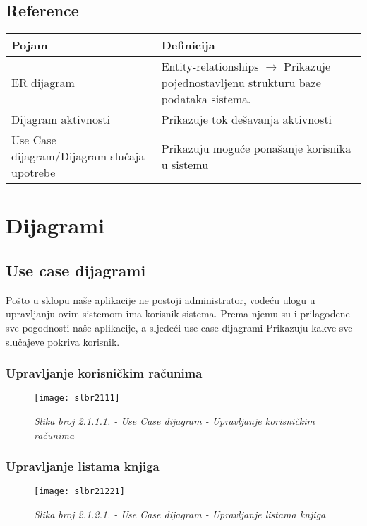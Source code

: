 \documentclass[a4paper oneside ,12pt]{article}
\begin{document}
\subsection{Reference}

\begin{center}
\begin{longtable}{| p{} | p{} |} 
 \hline
 \rowcolor{Apricot}
Pojam &	Definicija \\ \hline
ER dijagram	& Entity-relationships $\to$ Prikazuje pojednostavljenu strukturu baze podataka sistema. \\ \hline
Dijagram aktivnosti	 & Prikazuje tok dešavanja aktivnosti \\ \hline
Use Case dijagram/Dijagram slučaja upotrebe &	Prikazuju moguće ponašanje korisnika u sistemu \\ \hline

\end{longtable}
\end{center} 


\newpage
\section{Dijagrami}
\subsection{Use case dijagrami}
Pošto u sklopu naše aplikacije ne postoji administrator, vodeću ulogu u upravljanju ovim sistemom ima korisnik sistema. Prema njemu su i prilagođene sve pogodnosti naše aplikacije, a sljedeći use case dijagrami Prikazuju kakve sve slučajeve pokriva korisnik. \par
 
\subsubsection{Upravljanje korisničkim računima}
\begin{center}
\begin{figure}[H] 
\begin{center}
\texttt{[image: slbr2111]}
\caption*{\textit{Slika broj 2.1.1.1. - Use Case dijagram - Upravljanje korisničkim računima}}
\end{center}
\end{figure}
\end{center}

\subsubsection{Upravljanje listama knjiga}
\begin{center}
\begin{figure}[H] 
\begin{center}
\texttt{[image: slbr21221]}
\caption*{\textit{Slika broj 2.1.2.1. - Use Case dijagram - Upravljanje listama knjiga}}
\end{center}
\end{figure}
\end{center}
\end{document}

